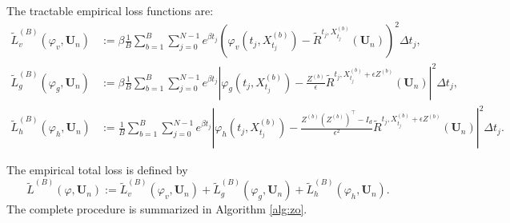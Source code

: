 \documentclass[twoside,11pt]{article}
\newcommand{\1}{\mathbf{1}}
\numberwithin{equation}{section}
\begin{document}
The tractable empirical loss functions are:
\begin{equation}\label{eq: empirical loss}
\begin{aligned}
    \tilde L_v^{(B)}(\varphi_v,\mathbf{U}_n) &:= \beta\frac{1}{B}\sum_{b=1}^B\sum_{j=0}^{N-1} e^{\beta t_j}\left( \varphi_v(t_j,X_{t_j}^{(b)}) - \tilde R^{t_j,X_{t_j}^{(b)}}(\mathbf{U}_n) \right)^2 \Delta t_j, \\
    \tilde L_{g}^{(B)}(\varphi_g,\mathbf{U}_n) &:= \beta\frac{1}{B}\sum_{b = 1}^{B}\sum_{j = 0}^{N-1} e^{\beta t_j}\left| \varphi_g(t_j,X_{t_j}^{(b)}) - \frac{Z^{(b)}}{\epsilon} \tilde R^{t_j, X_{t_j}^{(b)}+\epsilon Z^{(b)}}(\mathbf{U}_n) \right|^2 \Delta t_j, \\
    \tilde L_{h}^{(B)}(\varphi_{h},\mathbf{U}_n) &:= \frac{1}{B}\sum_{b = 1}^{B}\sum_{j = 0}^{N-1} e^{\beta t_j}\left| \varphi_h(t_j,X_{t_j}^{(b)}) - \frac{Z^{(b)}(Z^{(b)})^{\top} - I_d}{\epsilon^2} \tilde R^{t_j, X_{t_j}^{(b)}+\epsilon Z^{(b)}}(\mathbf{U}_n) \right|^2 \Delta t_j.
\end{aligned}
\end{equation}

The empirical total loss is defined by
\begin{equation}\label{eq: empirical total loss}
    \tilde L^{(B)}(\varphi,\mathbf{U}_n):=  \tilde L_v^{(B)}(\varphi_v,\mathbf{U}_n) + \tilde L^{(B)}_{g}(\varphi_g,\mathbf{U}_n) + \tilde L^{(B)}_{h}(\varphi_{h},\mathbf{U}_n).
\end{equation}
The complete procedure is summarized in Algorithm \ref{alg:zo}.
\end{document}
